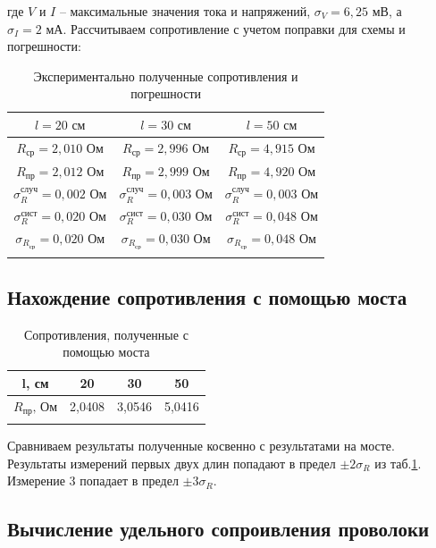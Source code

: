 \documentclass[a4paper, 12pt]{article}
\begin{document}
\noindent где $V$ и $I$ -- максимальные значения тока и напряжений, $\sigma_V = 6,25 \text{ мВ}$, а $\sigma_I = 2 \text{ мА}$. Рассчитываем сопротивление с учетом поправки для схемы и погрешности:

\begin{longtable}[H]{|c||c||c|}
	\hline
	$l = 20 \text{ см}$ & $l = 30 \text{ см}$ & $l = 50 \text{ см}$ \\
	\hline
	$R_\text{ср} = 2,010\text{ Ом}$ & $R_\text{ср} = 2,996 \text{ Ом}$ & $R_\text{ср} = 4,915 \text{ Ом}$ \\
	\hline
	$R_\text{пр} = 2,012 \text{ Ом}$ & $R_\text{пр} = 2,999 \text{ Ом}$ & $R_\text{пр} = 4,920 \text{ Ом}$\\
	\hline
	$\sigma_R^\text{случ} = 0,002\text{ Ом}$ & $\sigma_R^\text{случ} = 0,003\text{ Ом}$ & $\sigma_R^\text{случ} = 0,003\text{ Ом}$ \\
	\hline
	$\sigma_R^\text{сист} = 0,020 \text{ Ом}$ & $\sigma_R^\text{сист} = 0,030 \text{ Ом}$ & $\sigma_R^\text{сист} = 0,048 \text{ Ом}$ \\
	\hline
	$\sigma_{R_\text{ср}} = 0,020 \text{ Ом}$ & $\sigma_{R_\text{ср}} = 0,030 \text{ Ом}$ & $\sigma_{R_\text{ср}} = 0,048 \text{ Ом}$ \\
	\hline
	
	\caption{Экспериментально полученные сопротивления и погрешности}
	\label{R}
\end{longtable}

\subsection{Нахождение сопротивления с помощью моста}

\begin{longtable}[H]{|c|c|c|c|}
	\hline
	l, см & 20 & 30 & 50 \\
	\hline
	$R_\text{пр} \text{, Ом}$ & 2,0408 & 3,0546 & 5,0416 \\
	\hline
	
	\caption{Сопротивления, полученные с помощью моста}
	\label{most}
\end{longtable}

Сравниваем результаты полученные косвенно с результатами на мосте. Результаты измерений первых двух длин попадают в предел $\pm2\sigma_R$ из таб.\ref{R}. Измерение 3 попадает в предел $\pm3\sigma_R$.

\newpage

\subsection{Вычисление удельного сопроивления проволоки}
\end{document}
